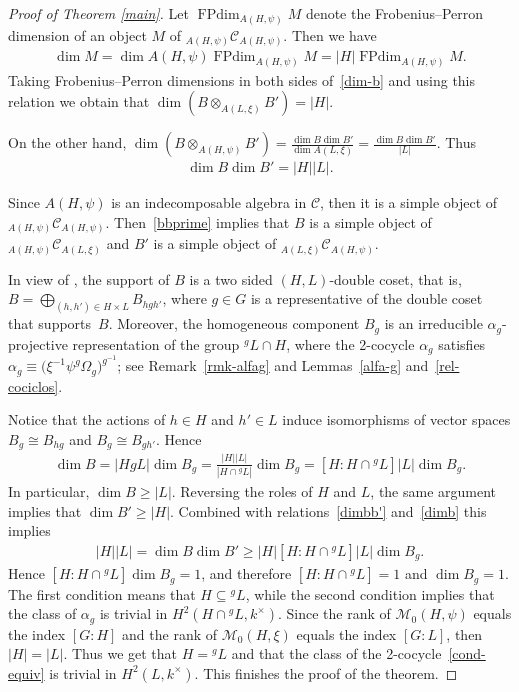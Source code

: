 \documentclass[11pt]{article}
\numberwithin{equation}{section}
\newcommand{\cch}{\Omega}
\newcommand{\C}{{\mathcal C}}
\newcommand{\M}{{\mathcal M}}
\newcommand{\1}{\textbf{1}}
\newcommand\FPdim{\operatorname{FPdim}}
\begin{document}
\begin{proof}[Proof of Theorem \ref{main}]
Let $\FPdim_{A(H, \psi)}M$ denote the Frobenius--Perron dimension of an object $M$ of $_{A(H, \psi)}\C_{A(H, \psi)}$. Then we have
\begin{gather*}\dim M = \dim A(H, \psi) \FPdim_{A(H, \psi)}M = |H| \FPdim_{A(H, \psi)}M.\end{gather*}
Taking Frobenius--Perron dimensions in both sides of~\eqref{dim-b} and using this relation we obtain that $\dim \left(B \otimes_{A(L, \xi)}B'\right) = |H|$.

On the other hand, $\dim (B \otimes_{A(H, \psi)}B' ) = \frac{\dim B \dim B'}{\dim{A(L, \xi)}} = \frac{\dim B \dim B'}{|L|}$. Thus
\begin{gather}\label{dimbb'} \dim B \dim B' = |H| |L|. \end{gather}

Since $A(H, \psi)$ is an indecomposable algebra in $\C$, then it is a simple object of $_{A(H, \psi)}\C_{A(H, \psi)}$. Then~\eqref{bbprime} implies that $B$ is a simple object of $_{A(H, \psi)}\C_{A(L, \xi)}$ and $B'$ is a simple object of $_{A(L, \xi)}\C_{A(H, \psi)}$.

In view of \cite[Proposition~3.2]{ostrik}, the support of $B$ is a two sided $(H, L)$-double coset, that is, $B = \bigoplus_{(h,h') \in H \times L} B_{hgh'}$, where $g \in G$ is a representative of the double coset that supports~$B$. Moreover, the homogeneous component $B_g$ is an irreducible $\alpha_g$-projective representation of the group $^gL \cap H$, where the 2-cocycle $\alpha_g$ satisf\/ies~$\alpha_g \equiv \big(\xi^{-1}\psi^g \cch_g\big)^{g^{-1}}$; see Remark~\ref{rmk-alfag} and Lemmas~\ref{alfa-g} and~\ref{rel-cociclos}.

Notice that the actions of $h \in H$ and $h'\in L$ induce isomorphisms of vector spaces $B_{g} \cong B_{hg}$ and $B_{g} \cong B_{gh'}$. Hence
\begin{gather}\label{dimb}\dim B = |HgL| \dim B_g = \frac{|H| |L|}{|H \cap {} ^gL|} \dim B_g = [H: H \cap {}^gL] |L| \dim B_g.\end{gather}
In particular, $\dim B \geq |L|$. Reversing the roles of $H$ and $L$, the same argument implies that $\dim B' \geq |H|$. Combined with relations~\eqref{dimbb'} and~\eqref{dimb} this implies
\begin{gather*}|H| |L| = \dim B \dim B' \geq |H| [H : H \cap {}^gL] |L| \dim B_g.\end{gather*}
Hence $[H\colon H \cap {}^gL] \dim B_g = 1$, and therefore $[H\colon H \cap {}^gL] = 1$ and $\dim B_g = 1$. The f\/irst condition means that $H \subseteq {}^gL$, while the second condition implies that the class of $\alpha_g$ is trivial in $H^2(H \cap {}^gL, k^\times)$. Since the rank of $\M_0(H, \psi)$ equals the index $[G:H]$ and the rank of $\M_0(H, \xi)$ equals the index $[G:L]$, then $|H| = |L|$. Thus we get that $H = {}^gL$ and that the class of the 2-cocycle~\eqref{cond-equiv} is trivial in $H^2(L, k^\times)$. This f\/inishes the proof of the theorem.
 \end{proof}
\end{document}
